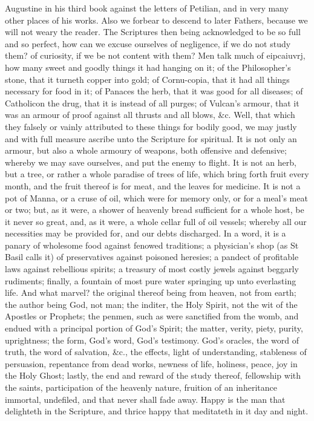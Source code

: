 Augustine in his third book against the letters of Petilian, and in very many other places of his works. Also we forbear to descend to later Fathers, because we will not weary the reader. The Scriptures then being acknowledged to be so full and so perfect, how can we excuse ourselves of negligence, if we do not study them? of curiosity, if we be not content with them? Men talk much of eipcaiuvrj, how many sweet and goodly things it had hanging on it; of the Philosopher's stone, that it turneth copper into gold; of Cornu-copia, that it had all things necessary for food in it; of Panaces the herb, that it was good for all diseases; of Catholicon the drug, that it is instead of all purges; of Vulcan's armour, that it was an armour of proof against all thrusts and all blows, &c. Well, that which they falsely or vainly attributed to these things for bodily good, we may justly and with full measure ascribe unto the Scripture for spiritual. It is not only an armour, but also a whole armoury of weapons, both offensive and defensive; whereby we may save ourselves, and put the enemy to flight. It is not an herb, but a tree, or rather a whole paradise of trees of life, which bring forth fruit every month, and the fruit thereof is for meat, and the leaves for medicine. It is not a pot of Manna, or a cruse of oil, which were for memory only, or for a meal's meat or two; but, as it were, a shower of heavenly bread sufficient for a whole host, be it never so great, and, as it were, a whole cellar full of oil vessels; whereby all our necessities may be provided for, and our debts discharged. In a word, it is a panary of wholesome food against fenowed traditions; a physician's shop (as St Basil calls it) of preservatives against poisoned heresies; a pandect of profitable laws against rebellious spirits; a treasury of most costly jewels against beggarly rudiments; finally, a fountain of most pure water springing up unto everlasting life. And what marvel? the original thereof being from heaven, not from earth; the author being God, not man; the inditer, the Holy Spirit, not the wit of the Apostles or Prophets; the penmen, such as were sanctified from the womb, and endued with a principal portion of God's Spirit; the matter, verity, piety, purity, uprightness; the form, God's word, God's testimony. God's oracles, the word of truth, the word of salvation, &c., the effects, light of understanding, stableness of persuasion, repentance from dead works, newness of life, holiness, peace, joy in the Holy Ghost; lastly, the end and reward of the study thereof, fellowship with the saints, participation of the heavenly nature, fruition of an inheritance immortal, undefiled, and that never shall fade away. Happy is the man that delighteth in the Scripture, and thrice happy that meditateth in it day and night.

